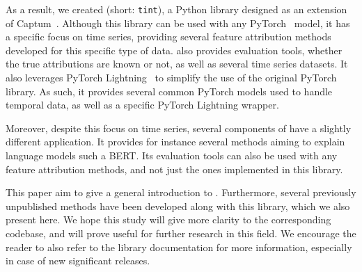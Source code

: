 As a result, we created \texttt{} (short: \texttt{tint}), a Python library designed as an
extension of Captum~\citep{kokhlikyan2020captum}.
Although this library can be used with any PyTorch~\citep{NEURIPS2019_9015} model, it has a specific focus on time series,
providing several feature attribution methods developed for this specific type of data.
\texttt{} also provides evaluation tools, whether the true attributions are known or not, as
well as several time series datasets.
It also leverages PyTorch Lightning~\citep{Falcon_PyTorch_Lightning_2019} to simplify the use of the original PyTorch
library.
As such, it provides several common PyTorch models used to handle temporal data, as well as a specific PyTorch Lightning
wrapper.

Moreover, despite this focus on time series, several components of \texttt{} have a slightly
different application.
It provides for instance several methods aiming to explain language models such a BERT\@.
Its evaluation tools can also be used with any feature attribution methods, and not just the ones implemented in
this library.

This paper aim to give a general introduction to \texttt{}.
Furthermore, several previously unpublished methods have been developed along with this library, which we also present
here.
We hope this study will give more clarity to the corresponding codebase, and will prove useful for further research
in this field.
We encourage the reader to also refer to the library documentation for more information, especially in case of
new significant releases.